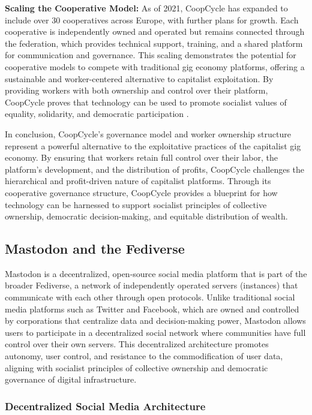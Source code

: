 \begin{refsection}
\textbf{Scaling the Cooperative Model:} As of 2021, CoopCycle has expanded to include over 30 cooperatives across Europe, with further plans for growth. Each cooperative is independently owned and operated but remains connected through the federation, which provides technical support, training, and a shared platform for communication and governance. This scaling demonstrates the potential for cooperative models to compete with traditional gig economy platforms, offering a sustainable and worker-centered alternative to capitalist exploitation. By providing workers with both ownership and control over their platform, CoopCycle proves that technology can be used to promote socialist values of equality, solidarity, and democratic participation \cite[pp.~89-105]{mason2015}.

In conclusion, CoopCycle’s governance model and worker ownership structure represent a powerful alternative to the exploitative practices of the capitalist gig economy. By ensuring that workers retain full control over their labor, the platform’s development, and the distribution of profits, CoopCycle challenges the hierarchical and profit-driven nature of capitalist platforms. Through its cooperative governance structure, CoopCycle provides a blueprint for how technology can be harnessed to support socialist principles of collective ownership, democratic decision-making, and equitable distribution of wealth.

\subsection{Mastodon and the Fediverse}

Mastodon is a decentralized, open-source social media platform that is part of the broader Fediverse, a network of independently operated servers (instances) that communicate with each other through open protocols. Unlike traditional social media platforms such as Twitter and Facebook, which are owned and controlled by corporations that centralize data and decision-making power, Mastodon allows users to participate in a decentralized social network where communities have full control over their own servers. This decentralized architecture promotes autonomy, user control, and resistance to the commodification of user data, aligning with socialist principles of collective ownership and democratic governance of digital infrastructure.

\subsubsection{Decentralized Social Media Architecture}


\end{refsection}
